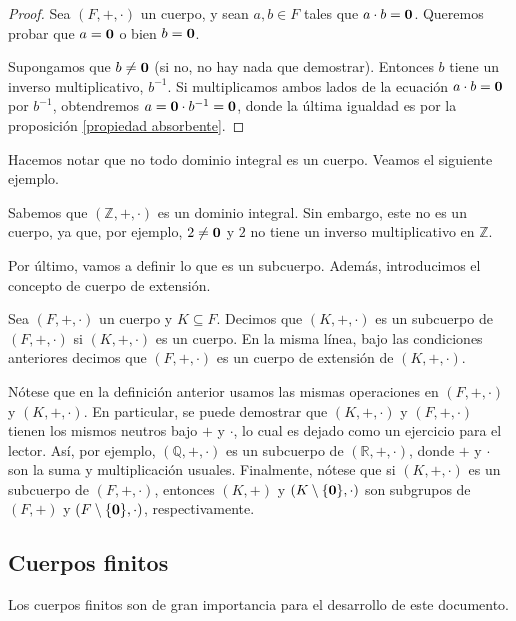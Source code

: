 \begin{proof} 
Sea $(F, +, \cdot)$ un cuerpo, y sean $a, b \in F$ tales que $a \cdot b = \mathbf{0}$. Queremos probar que $a = \mathbf{0}$ o bien $b = \mathbf{0}$.

Supongamos que $b \neq \mathbf{0}$ (si no, no hay nada que demostrar). Entonces $b$ tiene un inverso multiplicativo, $b^{-1}$. Si multiplicamos ambos lados de la ecuación $a \cdot b = \mathbf{0}$ por $b^{-1}$, obtendremos $a = \mathbf{0} \cdot b^{-1} = \mathbf{0}$, donde la última igualdad es por la proposición \ref{propiedad absorbente}.
\end{proof}

Hacemos notar que no todo dominio integral es un cuerpo. Veamos el siguiente ejemplo.

\begin{example}
Sabemos que $(\mathbb{Z}, +, \cdot)$ es un dominio integral. Sin embargo, este no es un cuerpo, ya que, por ejemplo, $2 \neq \mathbf{0}$ y $2$ no tiene un inverso multiplicativo en $\mathbb{Z}$.
\end{example}


Por último, vamos a definir lo que es un subcuerpo. Además, introducimos el concepto de cuerpo de extensión.
\begin{definition}
Sea $(F,+,\cdot)$ un cuerpo y $K\subseteq F$. Decimos que $(K,
+, \cdot)$ es un subcuerpo de $(F,+,\cdot)$ si $(K, +, \cdot)$ es un
cuerpo. En la misma línea, bajo las condiciones anteriores decimos que
$(F,+,\cdot)$ es un cuerpo de extensión de $(K,+,\cdot)$.
\end{definition}

Nótese que en la definición anterior usamos las mismas operaciones en
$(F,+,\cdot)$ y $(K, +, \cdot)$. En particular, se puede demostrar que
$(K, +, \cdot)$ y $(F,+,\cdot)$ tienen los mismos neutros bajo $+$ y
$\cdot$, lo cual es dejado como un ejercicio para el lector. Así, por
ejemplo, $(\mathbb{Q}, +, \cdot)$ es un subcuerpo de $(\mathbb{R},
+, \cdot)$, donde $+$ y $\cdot$ son la suma y multiplicación
usuales. Finalmente, nótese que si $(K, +, \cdot)$ es un subcuerpo de
$(F,+,\cdot)$, entonces $(K, +)$ y $(K \setminus \{\mathbf{0}\}, \cdot)$ son
subgrupos de $(F, +)$ y $(F \setminus \{\mathbf{0}\}, \cdot)$,
respectivamente.



\subsection{Cuerpos finitos}
Los cuerpos finitos son de gran importancia para el desarrollo de este
documento.


